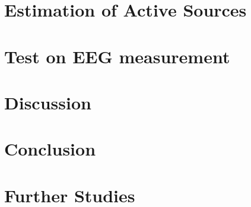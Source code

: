 % 


\pagestyle{empty} %




\cleardoublepage

\pagestyle{fancy} %


\cleardoublepage
%

\tableofcontents










\chapter{Estimation of Active Sources}
\chapter{Test on EEG measurement}
\chapter{Discussion}
\chapter{Conclusion}
\chapter{Further Studies}


\printbibliography[heading=bibintoc, title=Bibliography]
\label{bib:mybiblio}

\appendix



%

